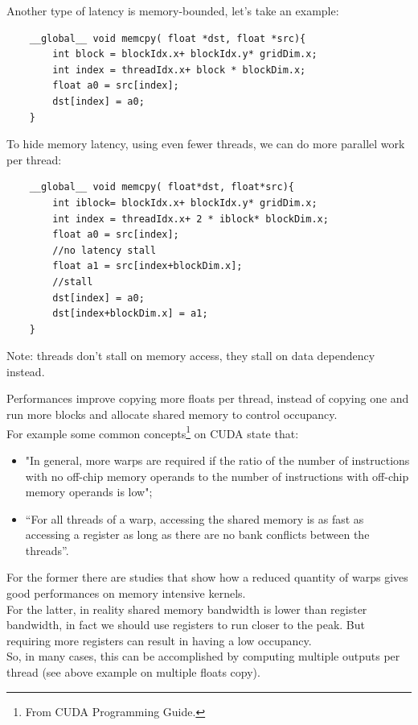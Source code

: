 Another type of latency is memory-bounded, let's take an example:
\begin{lstlisting}
	__global__ void memcpy( float *dst, float *src){
		int block = blockIdx.x+ blockIdx.y* gridDim.x;
		int index = threadIdx.x+ block * blockDim.x;
		float a0 = src[index];
		dst[index] = a0;
	}
\end{lstlisting}
To hide memory latency, using even fewer threads, we can do more parallel work per thread:
\begin{lstlisting}
	__global__ void memcpy( float*dst, float*src){
		int iblock= blockIdx.x+ blockIdx.y* gridDim.x;
		int index = threadIdx.x+ 2 * iblock* blockDim.x;
		float a0 = src[index]; 
		//no latency stall
		float a1 = src[index+blockDim.x]; 
		//stall
		dst[index] = a0;
		dst[index+blockDim.x] = a1;
	}
\end{lstlisting}
Note: threads don't stall on memory access, they stall on data dependency instead.

Performances improve copying more floats per thread, instead of copying one and run more blocks and allocate shared memory to control occupancy\cite{loweroccupancy}.\\
For example some common concepts\footnote{From CUDA Programming Guide.} on CUDA state that:
\begin{itemize}
\item "In general, more warps are required if the ratio of the number of instructions with no off-chip memory operands to the number of instructions with off-chip memory operands is low";  %
\item “For all threads of a warp, accessing the shared memory is as fast as accessing a register as long as there are no bank conflicts between the threads”\cite{cudaguide}. 
\end{itemize}
For the former there are studies that show how a reduced quantity of warps gives good performances on memory intensive kernels.\\
For the latter, in reality shared memory bandwidth is lower than register bandwidth, in fact we should use registers to run closer to the peak.
But requiring more registers can result in having a low occupancy.\\
So, in many cases, this can be accomplished by computing multiple outputs per thread (see above example on multiple floats copy)\cite{loweroccupancy,understandlatency}.


